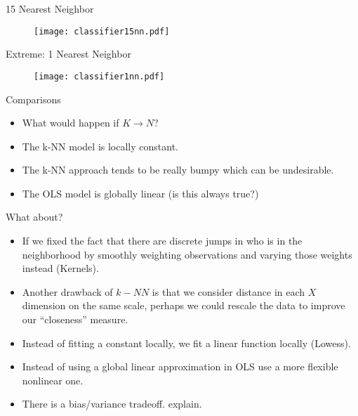 \documentclass[11pt,handout,xcolor=pdftex,dvipsnames,table,mathserif]{beamer}
\begin{document}
\begin{frame}{15 Nearest Neighbor}
\begin{figure}[htbp]
\begin{center}
\texttt{[image: classifier15nn.pdf]}
\label{class15nn}
\end{center}
\end{figure}
\end{frame}

\begin{frame}{Extreme: 1 Nearest Neighbor}
\begin{figure}[htbp]
\begin{center}
\texttt{[image: classifier1nn.pdf]}
\label{class15nn}
\end{center}
\end{figure}
\end{frame}

\begin{frame}{Comparisons}
\begin{itemize}
\item What would happen if $K \rightarrow N$?
\item The k-NN model is locally constant.
\item The k-NN approach tends to be really bumpy which can be undesirable.
\item The OLS model is globally linear (is this always true?)
\end{itemize}
\end{frame}
\begin{frame}{What about?}
\begin{itemize}
\item If we fixed the fact that there are discrete jumps in who is in the neighborhood by smoothly weighting observations and varying those weights instead (Kernels).
\item Another drawback of $k-NN$ is that we consider distance in each $X$ dimension on the same scale, perhaps we could rescale the data to improve our ``closeness'' measure.
\item Instead of fitting a constant locally, we fit a linear function locally (Lowess).
\item Instead of using a global linear approximation in OLS use a more flexible nonlinear one.
\item There is a bias/variance tradeoff. \alert{explain}.
\end{itemize}
\end{frame}
\end{document}
